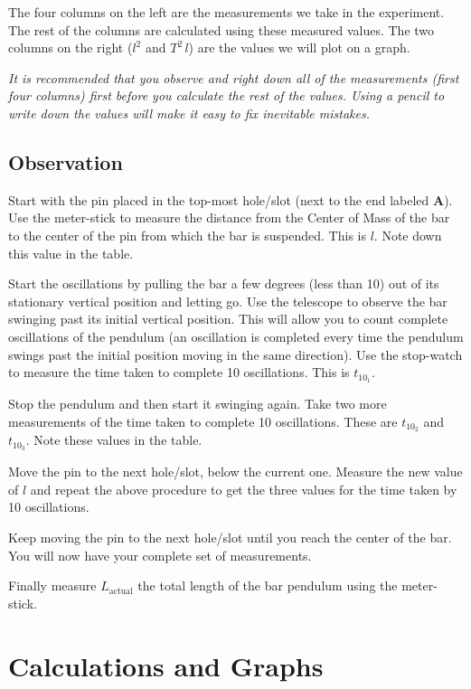 \documentclass{article}
\begin{document}
         The four columns on the left are the measurements we take in the experiment. The rest of the columns are calculated using these measured values. The two columns on the right ($l^2$ and $T^2 \, l$) are the values we will plot on a graph.

         \textit{It is recommended that you observe and right down all of the measurements (first four columns) first before you calculate the rest of the values. Using a pencil to write down the values will make it easy to fix inevitable mistakes.}

      \subsection*{Observation}

      Start with the pin placed in the top-most hole/slot (next to the end labeled \textbf{A}). Use the meter-stick to measure the distance from the Center of Mass of the bar to the center of the pin from which the bar is suspended. This is $l$. Note down this value in the table.

      Start the oscillations by pulling the bar a few degrees (less than 10) out of its stationary vertical position and letting go. Use the telescope to observe the bar swinging past its initial vertical position. This will allow you to count complete oscillations of the pendulum (an oscillation is completed every time the pendulum swings past the initial position moving in the same direction). Use the stop-watch to measure the time taken to complete 10 oscillations. This is $t_{10_1}$.

      Stop the pendulum and then start it swinging again. Take two more measurements of the time taken to complete 10 oscillations. These are $t_{10_2}$ and $t_{10_3}$. Note these values in the table.

      Move the pin to the next hole/slot, below the current one. Measure the new value of $l$ and repeat the above procedure to get the three values for the time taken by 10 oscillations.

      Keep moving the pin to the next hole/slot until you reach the center of the bar. You will now have your complete set of measurements.

      Finally measure $L_\text{actual}$ the total length of the bar pendulum using the meter-stick.


   \section*{Calculations and Graphs}
\end{document}
